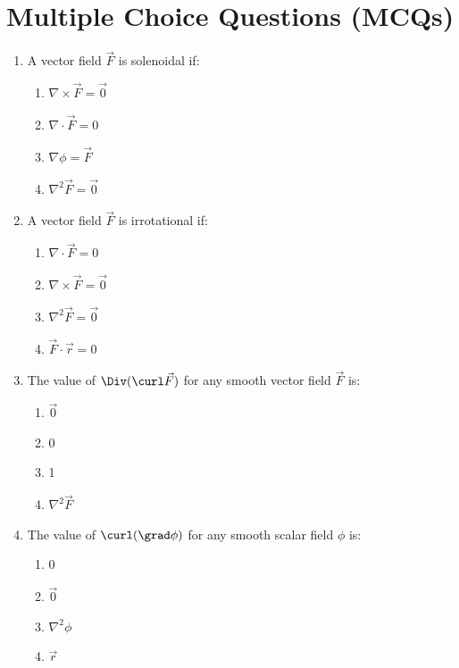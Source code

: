 \section{Multiple Choice Questions (MCQs)}

\begin{enumerate}[leftmargin=1.5em]
    \item A vector field $\vec{F}$ is solenoidal if:
    \begin{enumerate}[label=(\alph*)]
        \item $\nabla\times\vec{F} = \vec{0}$
        \item $\nabla\cdot\vec{F} = 0$
        \item $\nabla\phi = \vec{F}$
        \item $\nabla^2\vec{F} = \vec{0}$
    \end{enumerate}

    \item A vector field $\vec{F}$ is irrotational if:
    \begin{enumerate}[label=(\alph*)]
        \item $\nabla\cdot\vec{F} = 0$
        \item $\nabla\times\vec{F} = \vec{0}$
        \item $\nabla^2\vec{F} = \vec{0}$
        \item $\vec{F}\cdot\vec{r} = 0$
    \end{enumerate}

    \item The value of $\Div(\curl\vec{F})$ for any smooth vector field $\vec{F}$ is:
    \begin{enumerate}[label=(\alph*)]
        \item $\vec{0}$
        \item 0
        \item 1
        \item $\nabla^2\vec{F}$
    \end{enumerate}

    \item The value of $\curl(\grad\phi)$ for any smooth scalar field $\phi$ is:
    \begin{enumerate}[label=(\alph*)]
        \item 0
        \item $\vec{0}$
        \item $\nabla^2\phi$
        \item $\vec{r}$
    \end{enumerate}


\end{enumerate}
